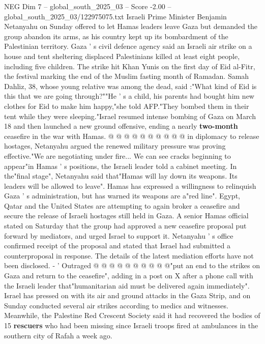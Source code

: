 \begin{textsample}{NEG Dim 7 – global\_south\_2025\_03 – Score -2.00 – global\_south\_2025\_03/122975075.txt}  \label{ex:f7_neg_021}
Israeli Prime Minister Benjamin Netanyahu on Sunday offered to let Hamas leaders leave Gaza but demanded the group abandon its arms, as his country kept up its bombardment of the Palestinian territory.
Gaza ' s civil defence agency said an Israeli air strike on a house and tent sheltering displaced Palestinians killed at least eight people, including five children.
The strike hit Khan Yunis on the first day of Eid al-Fitr, the festival marking the end of the Muslim fasting month of Ramadan.
Samah Dahliz, 38, whose young relative was among the dead, said :"What kind of Eid is this that we are going through?""He ' s a child, his parents had bought him new clothes for Eid to make him happy,"she told AFP."They bombed them in their tent while they were sleeping."Israel resumed intense bombing of Gaza on March 18 and then launched a new ground offensive, ending a nearly \textbf{two-month} ceasefire in the war with Hamas. @ @ @ @ @ @ @ @ @ @ in diplomacy to release hostages, Netanyahu argued the renewed military pressure was proving effective."We are negotiating under fire...
We can see cracks beginning to appear"in Hamas ' s positions, the Israeli leader told a cabinet meeting.
In the"final stage", Netanyahu said that"Hamas will lay down its weapons.
Its leaders will be allowed to leave".
Hamas has expressed a willingness to relinquish Gaza ' s administration, but has warned its weapons are a"red line".
Egypt, Qatar and the United States are attempting to again broker a ceasefire and secure the release of Israeli hostages still held in Gaza.
A senior Hamas official stated on Saturday that the group had approved a new ceasefire proposal put forward by mediators, and urged Israel to support it.
Netanyahu ' s office confirmed receipt of the proposal and stated that Israel had submitted a counterproposal in response.
The details of the latest mediation efforts have not been disclosed. - ' Outraged @ @ @ @ @ @ @ @ @ @"put an end to the strikes on Gaza and return to the ceasefire", adding in a post on X after a phone call with the Israeli leader that"humanitarian aid must be delivered again immediately".
Israel has pressed on with its air and ground attacks in the Gaza Strip, and on Sunday conducted several air strikes according to medics and witnesses.
Meanwhile, the Palestine Red Crescent Society said it had recovered the bodies of 15 \textbf{rescuers} who had been missing since Israeli troops fired at ambulances in the southern city of Rafah a week ago.

\end{textsample}
